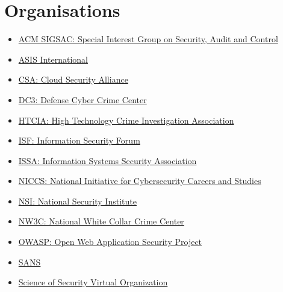 \documentclass[a4paper, 12pt, titlepage]{report}
\begin{document}
\section{Organisations}
\begin{multicols}{2}
\begin{itemize}
\item \href{http://www.sigsac.org/}{ACM SIGSAC: Special Interest Group on Security, Audit and Control}
\item \href{https://www.asisonline.org/}{ASIS International}
\item \href{https://cloudsecurityalliance.org/}{CSA: Cloud Security Alliance}
\item \href{https://www.dc3.mil/}{DC3: Defense Cyber Crime Center}
\item \href{https://htcia.org/}{HTCIA: High Technology Crime Investigation Association}
\item \href{https://www.securityforum.org/}{ISF: Information Security Forum}
\item \href{https://www.issa.org/default.aspx}{ISSA: Information Systems Security Association}
\item \href{https://niccs.us-cert.gov/}{NICCS: National Initiative for Cybersecurity Careers and Studies}
\item \href{https://www.nsi.org/}{NSI: National Security Institute}
\item \href{https://www.nw3c.org/}{NW3C: National White Collar Crime Center}
\item \href{https://www.owasp.org/index.php/Main_Page}{OWASP: Open Web Application Security Project}
\item \href{https://www.sans.org/}{SANS}
\item \href{https://cps-vo.org/group/SoS}{Science of Security Virtual Organization}
\end{itemize}
\end{multicols}
\end{document}
